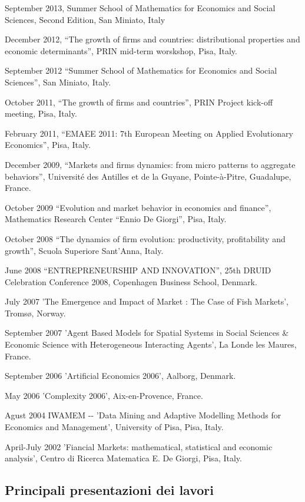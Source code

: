 \documentclass[a4paper]{article}
\begin{document}
September 2013, Summer School of Mathematics for Economics and Social
Sciences, Second Edition, San Miniato, Italy

December 2012, ``The growth of firms and countries: distributional
properties and economic determinants'', PRIN mid-term worskshop, Pisa,
Italy.

September 2012 ``Summer School of Mathematics for Economics and Social
Sciences'', San Miniato, Italy.

October 2011, ``The growth of firms and countries'', PRIN Project
kick-off meeting, Pisa, Italy.

February 2011, ``EMAEE 2011: 7th European Meeting on Applied
Evolutionary Economics'', Pisa, Italy.

December 2009, ``Markets and firms dynamics: from micro patterns to
aggregate behaviors'', Université des Antilles et de la Guyane,
Pointe-à-Pitre, Guadalupe, France.

October 2009 ``Evolution and market behavior in economics and finance'',
Mathematics Research Center ``Ennio De Giorgi'', Pisa, Italy.

October 2008 ``The dynamics of firm evolution: productivity,
profitability and growth'', Scuola Superiore Sant'Anna, Italy.

June 2008 ``ENTREPRENEURSHIP AND INNOVATION'', 25th DRUID Celebration
Conference 2008, Copenhagen Business School, Denmark.

July 2007 'The Emergence and Impact of Market : The Case of Fish
Markets', Tromsø, Norway.

September 2007 'Agent Based Models for Spatial Systems in Social
Sciences \& Economic Science with Heterogeneous Interacting Agents',
La Londe les Maures, France.

September 2006 'Artificial Economics 2006', Aalborg, Denmark.

May 2006 'Complexity 2006', Aix-en-Provence, France.

Agust 2004 IWAMEM -{}- 'Data Mining and Adaptive Modelling Methods for
Economics and Management', University of Pisa, Pisa, Italy.

April-July 2002 'Fiancial Markets: mathematical, statistical and
economic analysis', Centro di Ricerca Matematica E. De Giorgi, Pisa,
Italy.


\subsection{Principali presentazioni dei lavori%
  \label{principali-presentazioni-dei-lavori}%
}
\end{document}
